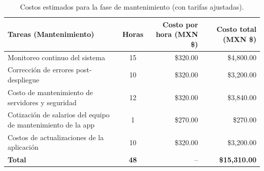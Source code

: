 \begin{table}[H]
	\centering
	\renewcommand{\arraystretch}{1.6}
	\setlength{\tabcolsep}{10pt}
	\Huge
	\begin{adjustbox}{max width=\textwidth}
		\begin{tabular}{|p{9.5cm}|c|r|r|}
			\hline
			\textbf{Tareas (Mantenimiento)} & \textbf{Horas} & \textbf{Costo por hora (MXN \$)} & \textbf{Costo total (MXN \$)} \\ \hline
			Monitoreo continuo del sistema & 15 & \$320.00 & \$4,800.00 \\ \hline
			Corrección de errores post-despliegue & 10 & \$320.00 & \$3,200.00 \\ \hline
			Costo de mantenimiento de servidores y seguridad & 12 & \$320.00 & \$3,840.00 \\ \hline
			Cotización de salarios del equipo de mantenimiento de la app & 1 & \$270.00 & \$270.00 \\ \hline
			Costos de actualizaciones de la aplicación & 10 & \$320.00 & \$3,200.00 \\ \hline
			\textbf{Total} & \textbf{48} & -- & \textbf{\$15,310.00} \\ \hline
		\end{tabular}
	\end{adjustbox}
	\caption{Costos estimados para la fase de mantenimiento (con tarifas ajustadas).}
	\label{tab:costos_mantenimiento}
\end{table}

